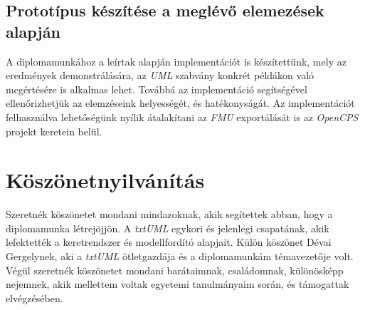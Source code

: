 \documentclass[a4paper,12pt]{report}
\begin{document}
\section{Prototípus készítése a meglévő elemezések alapján}
A diplomamunkához a leírtak alapján implementációt is készítettünk, mely az eredmények demonstrálására, az \textit{UML} szabvány konkrét példákon való megértésére is alkalmas lehet. Továbbá az implementáció segítségével ellenőrizhetjük az elemzéseink helyességét, és hatékonyságát. Az implementációt felhasználva lehetőségünk nyílik átalakítani az \textit{FMU} exportálását is az \textit{OpenCPS} projekt keretein belül.


\chapter*{Köszönetnyilvánítás}
Szeretnék köszönetet mondani mindazoknak, akik segítettek abban, hogy a diplomamunka létrejöjjön. A \textit{txtUML} egykori és jelenlegi csapatának, akik lefektették a keretrendszer és modellfordító alapjait. Külön köszönet Dévai Gergelynek, aki a \textit{txtUML} ötletgazdája és a diplomamunkám témavezetője volt. Végül szeretnék köszönetet mondani barátaimnak, családomnak, különösképp nejemnek, akik mellettem voltak egyetemi tanulmányaim során, és támogattak elvégzésében.
\end{document}
